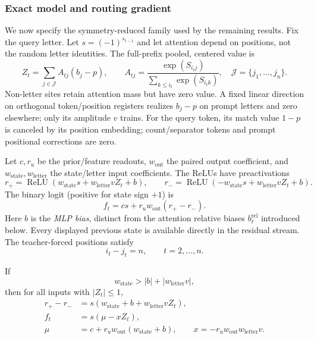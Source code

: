 \subsubsection{Exact model and routing gradient}
\label{app:weak-routing-family}

We now specify the symmetry-reduced family used by the remaining results.
Fix the query letter. Let $s=(-1)^{s_{t-1}}$ and let attention depend on positions, not the
random letter identities.  The full-prefix pooled, centered value is
\begin{equation}\label{eq:lr-centered-value}
 Z_t=\sum_{j\in\mathcal J}A_{tj}(b_j-p),\qquad
 A_{tj}=\frac{\exp(S_{i_tj})}{\sum_{k\le i_t}\exp(S_{i_tk})},
 \quad \mathcal J=\{j_1,\ldots,j_n\}.
\end{equation}
Non-letter sites retain attention mass but have zero value.
A fixed linear direction on orthogonal token/position registers realizes
$b_j-p$ on prompt letters and zero elsewhere; only its amplitude $v$ trains.
For the query token, its match value $1-p$ is canceled by its position
embedding; count/separator tokens and prompt positional corrections are zero.

Let $c,r_u$ be the prior/feature readouts, $w_{\mathrm{out}}$ the paired output coefficient,
and $w_{\mathrm{state}},w_{\mathrm{letter}}$ the state/letter input coefficients. The ReLUs have preactivations
\begin{equation}\label{eq:lr-gates}
 r_+=\operatorname{ReLU}(w_{\mathrm{state}} s+w_{\mathrm{letter}} vZ_t+b),\qquad
 r_-=\operatorname{ReLU}(-w_{\mathrm{state}} s+w_{\mathrm{letter}} vZ_t+b).
\end{equation}
The binary logit (positive for state sign $+1$) is
\begin{equation}\label{eq:lr-factor-logit}
 f_t=cs+r_uw_{\mathrm{out}}(r_+-r_-).
\end{equation}
Here $b$ is the \emph{MLP bias}, distinct from the attention
relative biases $b_\ell^{\mathrm{rel}}$ introduced below.
Every displayed previous state is available directly in the residual stream.
The teacher-forced positions satisfy
\begin{equation}\label{eq:lr-constant-lag}
 i_t-j_t=n,\qquad t=2,\ldots,n.
\end{equation}

If
\begin{equation}\label{eq:lr-gate-condition}
 w_{\mathrm{state}}>|b|+|w_{\mathrm{letter}} v|,
\end{equation}
then for all inputs with $|Z_t|\le1$,
\begin{equation}\label{eq:lr-feature-param}
 \begin{aligned}
 r_+-r_-&=s(w_{\mathrm{state}}+b+w_{\mathrm{letter}}v Z_t),\\
 f_t&=s(\mu-xZ_t),\\
\mu&=c+r_uw_{\mathrm{out}}(w_{\mathrm{state}}+b),\qquad x=-r_uw_{\mathrm{out}}w_{\mathrm{letter}}v.
 \end{aligned}
\end{equation}

